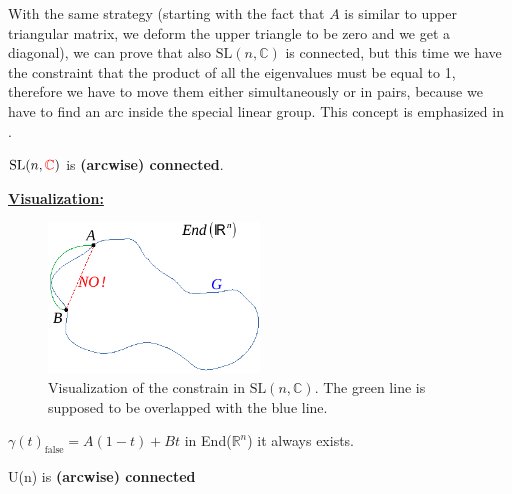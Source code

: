 \documentclass[../main.tex]{subfiles}
\begin{document}
With the same strategy (starting with the fact that $A$ is similar to upper triangular matrix, we deform the upper triangle to be zero and we get a diagonal), we can prove that also $\text{SL}(n, \mathbb{C})$ is connected, but this time we have the constraint that the product of all the eigenvalues must be equal to 1, therefore we have to move them either simultaneously or in pairs, because we have to find an arc inside the special linear group. This concept is emphasized in .
\begin{theorem}
$\text{SL}(n,{\color{red}\mathbb{C}})$ is \textbf{(arcwise) connected}.
\end{theorem}
\underline{\textbf{Visualization:}}
\begin{figure}[h!]
    \includegraphics[width=0.5\textwidth]{images/NOSasso.pdf}
    \caption{Visualization of the constrain in $\textrm{SL}(n,\mathbb{C})$. The green line is supposed to be overlapped with the blue line.}
\end{figure}
$\gamma(t)_{\textrm{false}}=A(1-t)+Bt$ in End($\mathbb{R}^n$) it always exists.
\begin{theorem}
U(n) is \textbf{(arcwise) connected}
\end{theorem}
\end{document}

